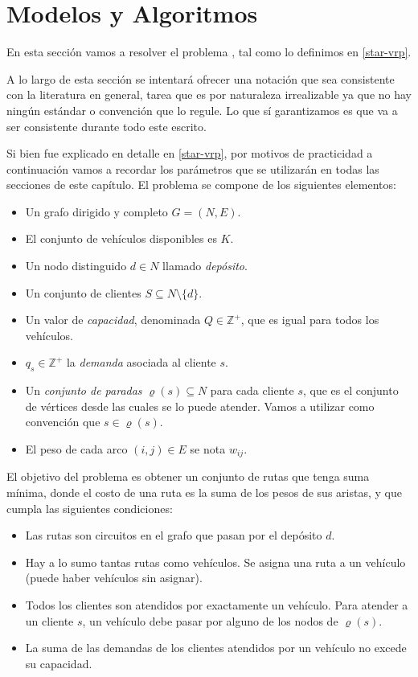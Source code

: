\chapter{Modelos y Algoritmos}
\label{chapter:algoritmos}

En esta sección vamos a resolver el problema , tal como lo definimos en \ref{star-vrp}.

A lo largo de esta sección se intentará ofrecer una notación que sea consistente con la literatura en general, tarea que es por naturaleza irrealizable ya que no hay ningún estándar o convención que lo regule. Lo que sí garantizamos es que va a ser consistente durante todo este escrito.

Si bien fue explicado en detalle en \ref{star-vrp}, por motivos de practicidad a continuación vamos a recordar los parámetros que se utilizarán en todas las secciones de este capítulo. El problema se compone de los siguientes elementos:

\begin{itemize}
    \item Un grafo dirigido y completo $G = (N, E)$.
    \item El conjunto de vehículos disponibles es $K$.
    \item Un nodo distinguido $d \in N$ llamado \emph{depósito}.
    \item Un conjunto de clientes $S \subseteq N \setminus \{d\}$.
    \item Un valor de \emph{capacidad}, denominada $Q \in \mathbb{Z}^{+}$, que es igual para todos los vehículos.
    \item  $q_s \in \mathbb{Z}^{+}$ la \emph{demanda} asociada al cliente $s$.
    \item Un \emph{conjunto de paradas} $\varrho(s) \subseteq N$ para cada cliente $s$, que es el conjunto de vértices desde las cuales se lo puede atender. Vamos a utilizar como convención que $s \in \varrho(s)$.
    \item El peso de cada arco $(i, j) \in E$ se nota $w_{ij}$.
\end{itemize}

El objetivo del problema es obtener un conjunto de rutas que tenga suma mínima, donde el costo de una ruta es la suma de los pesos de sus aristas, y que cumpla las siguientes condiciones:

\begin{itemize}
\label{list:restrictions}
    \item Las rutas son circuitos en el grafo que pasan por el depósito $d$.
    \item Hay a lo sumo tantas rutas como vehículos. Se asigna una ruta a un vehículo (puede haber vehículos sin asignar).
    \item Todos los clientes son atendidos por exactamente un vehículo. Para atender a un cliente $s$, un vehículo debe pasar por alguno de los nodos de $\varrho(s)$.
    \item La suma de las demandas de los clientes atendidos por un vehículo no excede su capacidad.
\end{itemize}


